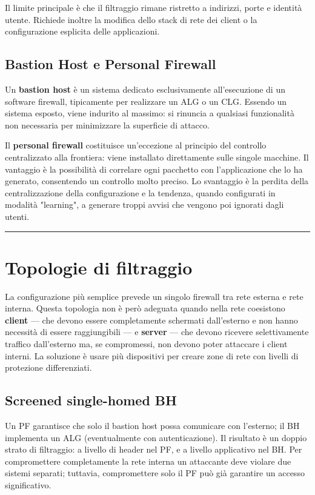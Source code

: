 \documentclass[12pt, a4paper]{report}
\begin{document}
Il limite principale è che il filtraggio rimane ristretto a indirizzi, porte e identità utente. Richiede inoltre la modifica dello stack di rete dei client o la configurazione esplicita delle applicazioni.

\subsection{Bastion Host e Personal Firewall}
Un \textbf{bastion host} è un sistema dedicato esclusivamente all'esecuzione di un software firewall, tipicamente per realizzare un ALG o un CLG. Essendo un sistema esposto, viene indurito al massimo: si rinuncia a qualsiasi funzionalità non necessaria per minimizzare la superficie di attacco.

Il \textbf{personal firewall} costituisce un'eccezione al principio del controllo centralizzato alla frontiera: viene installato direttamente sulle singole macchine. Il vantaggio è la possibilità di correlare ogni pacchetto con l'applicazione che lo ha generato, consentendo un controllo molto preciso. Lo svantaggio è la perdita della centralizzazione della configurazione e la tendenza, quando configurati in modalità "learning", a generare troppi avvisi che vengono poi ignorati dagli utenti.

\noindent\rule{\textwidth}{0.4pt}

\section{Topologie di filtraggio}

La configurazione più semplice prevede un singolo firewall tra rete esterna e rete interna. Questa topologia non è però adeguata quando nella rete coesistono \textbf{client} — che devono essere completamente schermati dall'esterno e non hanno necessità di essere raggiungibili — e \textbf{server} — che devono ricevere selettivamente traffico dall'esterno ma, se compromessi, non devono poter attaccare i client interni. La soluzione è usare più dispositivi per creare zone di rete con livelli di protezione differenziati.

\subsection{Screened single-homed BH}
Un PF garantisce che solo il bastion host possa comunicare con l'esterno; il BH implementa un ALG (eventualmente con autenticazione). Il risultato è un doppio strato di filtraggio: a livello di header nel PF, e a livello applicativo nel BH. Per compromettere completamente la rete interna un attaccante deve violare due sistemi separati; tuttavia, compromettere solo il PF può già garantire un accesso significativo.
\end{document}
